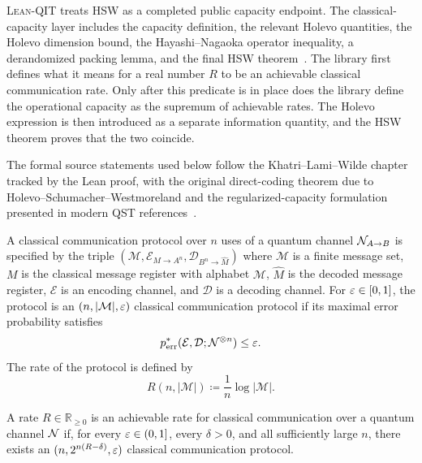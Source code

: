 \documentclass[10pt,a4paper]{article}
\DeclareRobustCommand{\LeanQIT}{\textnormal{\textsc{Lean-QIT}}}
\begin{document}
\LeanQIT{} treats HSW as a completed public capacity endpoint.  The
classical-capacity layer includes the capacity definition, the relevant
Holevo quantities, the Holevo dimension bound, the Hayashi--Nagaoka operator inequality, a derandomized packing lemma, and the final HSW theorem~\cite{HayashiNagaoka2003,KhatriLamiWilde2025Principles}. The library first defines what it means for a real number $R$ to be an achievable classical communication rate. Only after this predicate is in
place does the library define the operational capacity as the supremum of
achievable rates.  The Holevo expression is then introduced as a separate
information quantity, and the HSW theorem proves that the two coincide.

The formal source statements used below follow the Khatri--Lami--Wilde chapter~\cite{KhatriLamiWilde2025Principles} tracked by the Lean proof, with the original direct-coding theorem due to Holevo--Schumacher--Westmoreland and the regularized-capacity formulation presented in modern QST references~\cite{Holevo1998,Schumacher1996,HayashiNagaoka2003}.

\begin{definition}
    \label{def:hsw-classical-protocol}
    A classical communication protocol over $n$ uses of a quantum channel
    ${\cal N}_{A\to B}$ is specified by the triple $(\mathcal M,\mathcal E_{M\to A^n},\mathcal D_{B^n\to \widehat M})$ where $\mathcal M$ is a finite message set, $M$ is the classical message register with alphabet $\mathcal M$, $\widehat M$ is the decoded message register, $\mathcal E$ is an encoding channel, and $\mathcal D$ is a decoding channel.  For $\varepsilon\in[0,1]$, the protocol is an $(n,|\mathcal M|,\varepsilon)$ classical communication protocol if its maximal error
    probability satisfies
    \begin{equation}
        p_{\mathrm{err}}^*(\mathcal E,\mathcal D;{\cal N}^{\otimes n})\le \varepsilon .
    \end{equation}
    The rate of the protocol is defined by
    \begin{equation}
        R(n,|\mathcal M|)
        \coloneqq
        \frac{1}{n}\log|\mathcal M|.
    \end{equation}
\end{definition}

\begin{definition}
    \label{def:hsw-achievable-rate}
    A rate $R\in\mathbb R_{\ge 0}$ is an achievable rate for classical
    communication over a quantum channel ${\cal N}$ if, for every
    $\varepsilon\in(0,1]$, every $\delta>0$, and all sufficiently large $n$, there
    exists an $(n,2^{n(R-\delta)},\varepsilon)$ classical communication protocol.
\end{definition}
\end{document}
